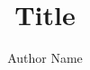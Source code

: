 \documentclass[12pt]{ruthesis}
\title{Title}
\author{Author Name}
\begin{document}
  \begin{frontmatter}
   \maketitle
   
   \tableofcontents
   \listoffigures
   \listoftables
%   
  \end{frontmatter}




\appendix

%
%
%
%



\end{document}
